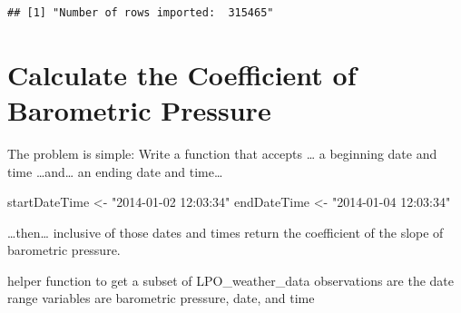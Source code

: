 \documentclass[
  11pt,
]{article}
\newenvironment{Shaded}{\begin{snugshade}}{\end{snugshade}}
\newcommand{\NormalTok}[1]{#1}
\newcommand{\OtherTok}[1]{\textcolor[rgb]{0.56,0.35,0.01}{#1}}
\newcommand{\StringTok}[1]{\textcolor[rgb]{0.31,0.60,0.02}{#1}}
\begin{document}
\begin{verbatim}
## [1] "Number of rows imported:  315465"
\end{verbatim}

\hypertarget{calculate-the-coefficient-of-barometric-pressure}{%
\section{Calculate the Coefficient of Barometric
Pressure}\label{calculate-the-coefficient-of-barometric-pressure}}

The problem is simple: Write a function that accepts \ldots{} a
beginning date and time \ldots and\ldots{} an ending date and
time\ldots{}

\begin{Shaded}
\begin{Highlighting}[]
\NormalTok{startDateTime }\OtherTok{\textless{}{-}} \StringTok{"2014{-}01{-}02 12:03:34"}
\NormalTok{endDateTime }\OtherTok{\textless{}{-}} \StringTok{"2014{-}01{-}04 12:03:34"}
\end{Highlighting}
\end{Shaded}

\ldots then\ldots{} inclusive of those dates and times return the
coefficient of the slope of barometric pressure.

helper function to get a subset of LPO\_weather\_data observations are
the date range variables are barometric pressure, date, and time
\end{document}
